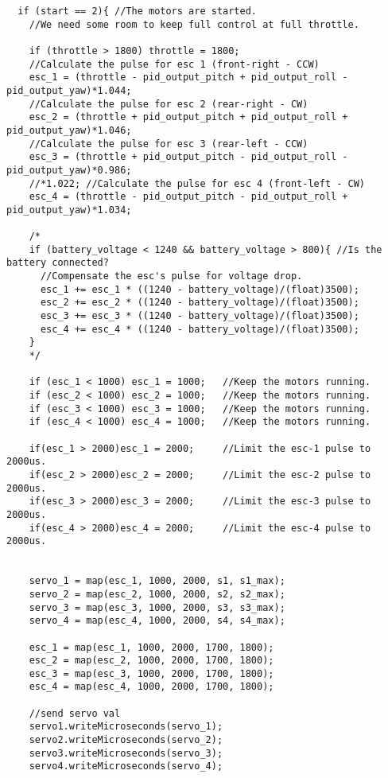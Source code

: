 \begin{lstlisting}
  if (start == 2){ //The motors are started.
    //We need some room to keep full control at full throttle.
    
    if (throttle > 1800) throttle = 1800; 
    //Calculate the pulse for esc 1 (front-right - CCW)
    esc_1 = (throttle - pid_output_pitch + pid_output_roll - pid_output_yaw)*1.044; 
    //Calculate the pulse for esc 2 (rear-right - CW)
    esc_2 = (throttle + pid_output_pitch + pid_output_roll + pid_output_yaw)*1.046;
    //Calculate the pulse for esc 3 (rear-left - CCW)
    esc_3 = (throttle + pid_output_pitch - pid_output_roll - pid_output_yaw)*0.986; 
    //*1.022; //Calculate the pulse for esc 4 (front-left - CW)
    esc_4 = (throttle - pid_output_pitch - pid_output_roll + pid_output_yaw)*1.034; 
    
    /*
    if (battery_voltage < 1240 && battery_voltage > 800){ //Is the battery connected?
      //Compensate the esc's pulse for voltage drop.
      esc_1 += esc_1 * ((1240 - battery_voltage)/(float)3500);              
      esc_2 += esc_2 * ((1240 - battery_voltage)/(float)3500);              
      esc_3 += esc_3 * ((1240 - battery_voltage)/(float)3500);              
      esc_4 += esc_4 * ((1240 - battery_voltage)/(float)3500);              
    } 
    */
    
    if (esc_1 < 1000) esc_1 = 1000;   //Keep the motors running.
    if (esc_2 < 1000) esc_2 = 1000;   //Keep the motors running.
    if (esc_3 < 1000) esc_3 = 1000;   //Keep the motors running.
    if (esc_4 < 1000) esc_4 = 1000;   //Keep the motors running.

    if(esc_1 > 2000)esc_1 = 2000;     //Limit the esc-1 pulse to 2000us.
    if(esc_2 > 2000)esc_2 = 2000;     //Limit the esc-2 pulse to 2000us.
    if(esc_3 > 2000)esc_3 = 2000;     //Limit the esc-3 pulse to 2000us.
    if(esc_4 > 2000)esc_4 = 2000;     //Limit the esc-4 pulse to 2000us.  


    servo_1 = map(esc_1, 1000, 2000, s1, s1_max); 
    servo_2 = map(esc_2, 1000, 2000, s2, s2_max);
    servo_3 = map(esc_3, 1000, 2000, s3, s3_max);
    servo_4 = map(esc_4, 1000, 2000, s4, s4_max); 

    esc_1 = map(esc_1, 1000, 2000, 1700, 1800);
    esc_2 = map(esc_2, 1000, 2000, 1700, 1800);
    esc_3 = map(esc_3, 1000, 2000, 1700, 1800);
    esc_4 = map(esc_4, 1000, 2000, 1700, 1800);
    
    //send servo val 
    servo1.writeMicroseconds(servo_1);
    servo2.writeMicroseconds(servo_2);
    servo3.writeMicroseconds(servo_3);
    servo4.writeMicroseconds(servo_4);


\end{lstlisting}
